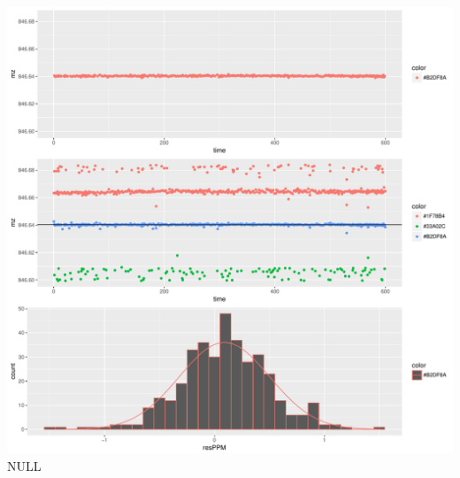 \documentclass[]{article}
\begin{document}
\includegraphics{Supplementary_document_files/figure-latex/filter.lm.846-1.pdf}
NULL
\end{document}
